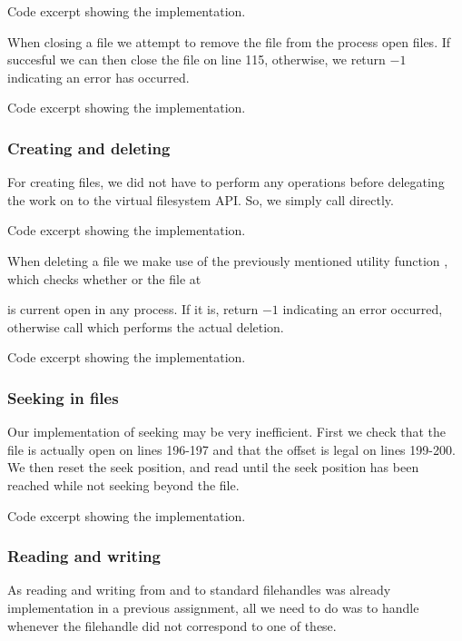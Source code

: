 {Code excerpt showing the  implementation.}

When closing a file we attempt to remove the file from the process open files.
If succesful we can then close the file on line 115, otherwise, we return $-1$
indicating an error has occurred.

{Code excerpt showing the  implementation.}

\newpage
\subsubsection{Creating and deleting}
For creating files, we did not have to perform any operations before
delegating the work on to the virtual filesystem API. So, we simply call
 directly.

{Code excerpt showing the  implementation.}

When deleting a file we make use of the previously mentioned utility function
, which checks whether or the file at

 is current open in any process. If it is, return $-1$
indicating an error occurred, otherwise call  which performs
the actual deletion.

{Code excerpt showing the  implementation.}

\subsubsection{Seeking in files}
Our implementation of seeking may be very inefficient. First we check that the
file is actually open on lines 196-197 and that the offset is legal on lines
199-200. We then reset the seek position, and read until the seek position has
been reached while not seeking beyond the file.

{Code excerpt showing the  implementation.}

\subsubsection{Reading and writing}
As reading and writing from and to standard filehandles
 was already implementation in a previous assignment,
all we need to do was to handle whenever the filehandle did not correspond to
one of these.

